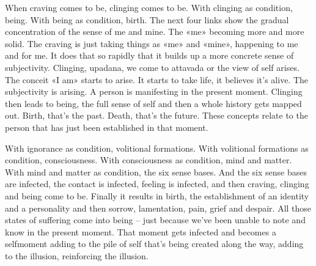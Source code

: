 \documentclass[letterpaper,10pt,english]{sphinxmanual}
\begin{document}
\sphinxAtStartPar
When  craving  comes  to  be,  clinging  comes  to  be.  With  clinging  as
condition, being. With being as condition, birth. The next four links show
the gradual concentration of the sense of me and mine. The «me» becoming
more and more solid. The craving is just taking things as «me» and «mine»,
happening to me and for me. It does that so rapidly that it builds up a more
concrete  sense  of  subjectivity.  Clinging,  upadana,  we  come  to  attavada  or
the view of self arises. The conceit «I am» starts to arise. It starts to take life,
it believes it’s alive. The subjectivity is arising. A person is manifesting in
the present moment. Clinging then leads to being, the full sense of self and
then a whole history gets mapped out. Birth, that’s the past. Death, that’s the
future. These concepts relate to the person that has just been established in
that moment.

\sphinxAtStartPar
With ignorance as condition, volitional formations. With volitional formations as condition, consciousness. With consciousness as condition, mind
and matter. With mind and matter as condition, the six sense bases. And the
six sense bases are infected, the contact is infected, feeling is infected, and
then craving, clinging and being come to be. Finally it results in birth, the
establishment of an identity and a personality and then sorrow, lamentation,
pain, grief and despair. All those states of suffering come into being – just
because we’ve been unable to note and know in the present moment. That
moment gets infected and becomes a self\sphinxhyphen{}moment adding to the pile of self
that’s  being  created  along  the  way,  adding  to  the  illusion,  reinforcing  the
illusion.
\end{document}
